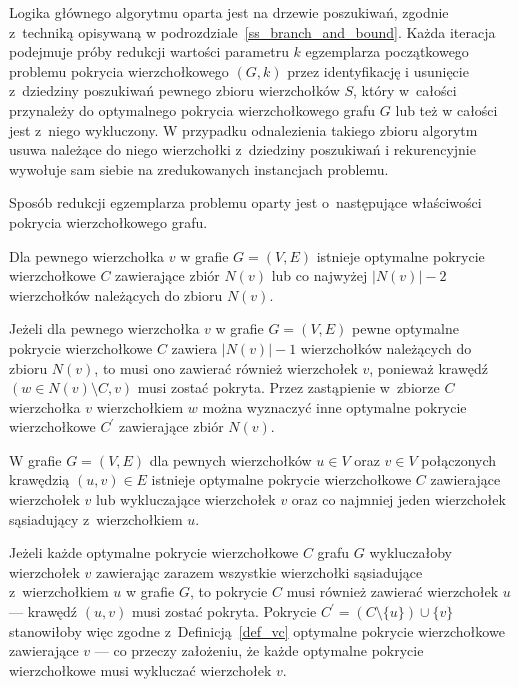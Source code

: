 \par{
  Logika głównego algorytmu oparta jest na drzewie poszukiwań, zgodnie z~techniką opisywaną w podrozdziale~\ref{ss_branch_and_bound}.
  Każda iteracja podejmuje próby redukcji wartości parametru $k$ egzemplarza początkowego problemu pokrycia wierzchołkowego $(G, k)$ przez identyfikację i usunięcie z~dziedziny poszukiwań pewnego zbioru wierzchołków $S$, który w~całości przynależy do optymalnego pokrycia wierzchołkowego grafu $G$ lub też w całości jest z~niego wykluczony.
  W przypadku odnalezienia takiego zbioru algorytm usuwa należące do niego wierzchołki z~dziedziny poszukiwań i rekurencyjnie wywołuje sam siebie na zredukowanych instancjach problemu.

  Sposób redukcji egzemplarza problemu oparty jest o~następujące właściwości pokrycia wierzchołkowego grafu.
  \begin{theorem}
    Dla pewnego wierzchołka $v$ w grafie $G=(V, E)$ istnieje optymalne pokrycie wierzchołkowe $C$ zawierające zbiór $N(v)$ lub co najwyżej $|N(v)| - 2$ wierzchołków należących do zbioru $N(v)$.
  \end{theorem}
  \begin{bproof}
    Jeżeli dla pewnego wierzchołka $v$ w grafie $G=(V, E)$ pewne optymalne pokrycie wierzchołkowe $C$ zawiera $|N(v)|-1$ wierzchołków należących do zbioru $N(v)$, to musi ono zawierać również wierzchołek $v$, ponieważ krawędź $(w \in N(v) \setminus C, v)$ musi zostać pokryta.
    Przez zastąpienie w~zbiorze $C$ wierzchołka $v$ wierzchołkiem $w$ można wyznaczyć inne optymalne pokrycie wierzchołkowe $C^\prime$ zawierające zbiór $N(v)$.
  \end{bproof}
  \begin{theorem}
     W grafie $G=(V, E)$ dla pewnych wierzchołków $u \in V$ oraz $v \in V$ połączonych krawędzią $(u, v) \in E$ istnieje optymalne pokrycie wierzchołkowe $C$ zawierające wierzchołek $v$ lub wykluczające wierzchołek $v$ oraz co najmniej jeden wierzchołek sąsiadujący z~wierzchołkiem $u$.
  \end{theorem}
  \begin{bproof}
    Jeżeli każde optymalne pokrycie wierzchołkowe $C$ grafu $G$ wykluczałoby wierzchołek $v$ zawierając zarazem wszystkie wierzchołki sąsiadujące z~wierzchołkiem $u$ w grafie $G$, to pokrycie $C$ musi również zawierać wierzchołek $u$ --- krawędź $(u, v)$ musi zostać pokryta.
    Pokrycie $C^\prime=(C \setminus \{u\}) \cup \{v\}$ stanowiłoby więc zgodne z~Definicją~\ref{def_vc} optymalne pokrycie wierzchołkowe zawierające $v$ --- co przeczy założeniu, że każde optymalne pokrycie wierzchołkowe musi wykluczać wierzchołek $v$.

\end{bproof}}
